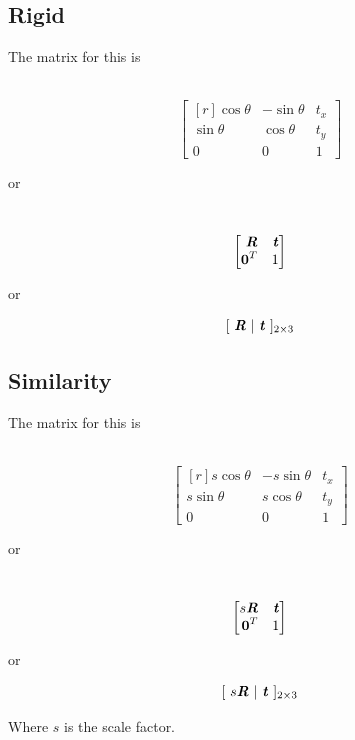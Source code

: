 \subsection{Rigid}
The matrix for this is 
\begin{minipage}{0.2\textwidth}
         \ \ \
                $$  \begin{bmatrix*}[r]
                \cos\theta      & -\sin\theta  & t_x \\
                \sin\theta       & \cos\theta  & t_y  \\
                0        & 0   & 1  
            \end{bmatrix*} $$   
\end{minipage}
or
\begin{minipage}{0.2\textwidth}
\ \ \
                $$  \begin{bmatrix*}[r]
                \textbf{\textit{R}}& \textbf{\textit{t}} \\
                \textbf{0}^T       & 1 
            \end{bmatrix*} $$
\end{minipage}
or
\begin{minipage}{0.2\textwidth}
    $$[ \ \textbf{\textit{R}} \ | \ \textbf{\textit{t}} \ ]_{2\times3}$$
\end{minipage}
            
            
\subsection{Similarity}
The matrix for this is 
\begin{minipage}{0.3\textwidth}
         \ \ \
                $$  \begin{bmatrix*}[r]
                s \cos\theta      & -s \sin\theta  & t_x \\
                s \sin\theta       & s \cos\theta  & t_y  \\
                0        & 0   & 1  
            \end{bmatrix*} $$   
\end{minipage}
or
\begin{minipage}{0.2\textwidth}
\ \ \
                $$  \begin{bmatrix*}[r]
                s\textbf{\textit{R}}& \textbf{\textit{t}} \\
                \textbf{0}^T       & 1 
            \end{bmatrix*} $$
\end{minipage}
or
\begin{minipage}{0.2\textwidth}
    $$[ \ s\textbf{\textit{R}} \ | \ \textbf{\textit{t}} \ ]_{2\times3}$$
\end{minipage}
Where $s$ is the scale factor.

